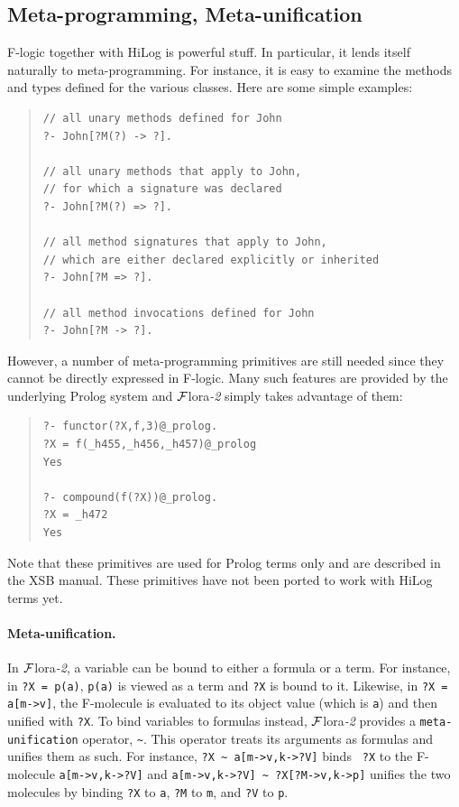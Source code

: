 \documentclass[11pt]{article}
\newcommand{\FLORA}{{\mbox{\sc ${\cal F}${lora}\rm\emph{-2}}}\xspace}
\newcommand{\fl}{\mbox{F-logic}\xspace}
\begin{document}
\subsection{Meta-programming, Meta-unification}
\label{sec-meta-reification}


%
\fl together with HiLog is powerful stuff. In particular, it lends itself
naturally to meta-programming. For instance, it is easy to examine the
methods and types defined for the various classes.  Here are some simple
examples:
\begin{quote}
\begin{verbatim}
// all unary methods defined for John
?- John[?M(?) -> ?].

// all unary methods that apply to John,
// for which a signature was declared
?- John[?M(?) => ?].

// all method signatures that apply to John,
// which are either declared explicitly or inherited
?- John[?M => ?].

// all method invocations defined for John
?- John[?M -> ?].
\end{verbatim}
\end{quote}

However, a number of meta-programming primitives are still needed
since they cannot be directly expressed in \fl. Many such features are
provided by the underlying Prolog system and \FLORA simply takes advantage of
them: 
\begin{quote}
\begin{verbatim}
?- functor(?X,f,3)@_prolog.
?X = f(_h455,_h456,_h457)@_prolog
Yes

?- compound(f(?X))@_prolog.
?X = _h472
Yes
\end{verbatim}
\end{quote}
Note that these primitives are used for Prolog terms only and
are described in the XSB manual. These primitives have not been ported to
work with HiLog terms yet.

\paragraph{Meta-unification.}
In \FLORA, a variable can be bound to either a formula or a term. For instance,
in {\tt ?X = p(a)}, {\tt p(a)} is viewed as a term and {\tt ?X} is bound to
it. Likewise, in {\tt ?X = a[m->v]}, the F-molecule is evaluated to its
object value (which is {\tt a}) and then unified with {\tt ?X}. To bind
variables to formulas instead, \FLORA provides a {\tt meta-unification}
operator, \verb|~|.  This operator treats its arguments as formulas and
unifies them as such. For instance, {\tt ?X \verb|~| a[m->v,k->?V]} binds {\tt
  ?X} to the F-molecule {\tt a[m->v,k->?V]} and {\tt a[m->v,k->?V] \verb|~|
  ?X[?M->v,k->p]} unifies the two molecules by binding {\tt ?X} to {\tt a},
{\tt ?M} to {\tt m}, and {\tt ?V} to {\tt p}.
\end{document}
